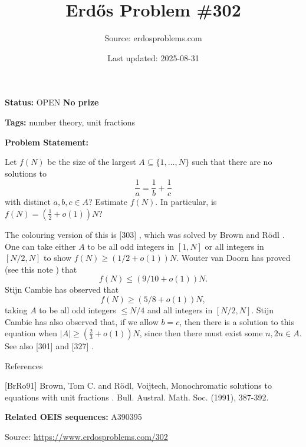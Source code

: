 \documentclass{article}
\title{Erd\H{o}s Problem \#302}
\date{Last updated: 2025-08-31}
\author{Source: erdosproblems.com}
\begin{document}
\maketitle

\noindent\textbf{Status:} OPEN \quad \textbf{No prize}

\noindent\textbf{Tags:} number theory, unit fractions

\medskip

\noindent\textbf{Problem Statement:}

Let $f(N)$ be the size of the largest $A\subseteq \{1,\ldots,N\}$ such that there are no solutions to\[\frac{1}{a}= \frac{1}{b}+\frac{1}{c}\]with distinct $a,b,c\in A$? Estimate $f(N)$. In particular, is $f(N)=(\tfrac{1}{2}+o(1))N$?




The colouring version of this is [303] , which was solved by Brown and R\"{o}dl \cite{BrRo91}. One can take either $A$ to be all odd integers in $[1,N]$ or all integers in $[N/2,N]$ to show $f(N)\geq (1/2+o(1))N$. Wouter van Doorn has proved (see this note ) that\[f(N) \leq (9/10+o(1))N.\]Stijn Cambie has observed that\[f(N)\geq (5/8+o(1))N,\]taking $A$ to be all odd integers $\leq N/4$ and all integers in $[N/2,N]$. Stijn Cambie has also observed that, if we allow $b=c$, then there is a solution to this equation when $\lvert A\rvert \geq (\tfrac{2}{3}+o(1))N$, since then there must exist some $n,2n\in A$. See also [301] and [327] .




References

[BrRo91] Brown, Tom C. and R\"{o}dl, Voijtech, Monochromatic solutions to equations with unit fractions . Bull. Austral. Math. Soc. (1991), 387-392.

\noindent\textbf{Related OEIS sequences:} A390395


\bigskip
\noindent\small{Source: \url{https://www.erdosproblems.com/302}}
\end{document}
